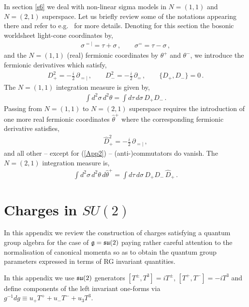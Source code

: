 \documentclass[12pt]{article}
\newcommand{\pp}{{=\!\!\!|}}
\begin{document}
 In section \ref{s6} we deal with non-linear sigma models in $N=(1,1)$ and $N=(2,1)$ superspace. Let us briefly review some of the notations appearing there and refer to e.g.\ \cite{Sevrin:2011mc} for more details. Denoting for this section the bosonic worldsheet light-cone coordinates by,
\begin{eqnarray}
\sigma ^\pp= \tau + \sigma\, ,\qquad \sigma ^== \tau - \sigma \,,
\end{eqnarray}
and the $N=(1,1)$ (real) fermionic coordinates by $ \theta ^+$ and $ \theta ^-$, we introduce the
fermionic derivatives which satisfy,
\begin{eqnarray}
D_+^2= - \frac{i}{2}\, \partial _\pp \,,\qquad D_-^2=- \frac{i}{2}\, \partial _= \,,
\qquad \{D_+,D_-\}=0\,.\label{App2}
\end{eqnarray}
The $N=(1,1)$ integration measure is given by,
\begin{eqnarray}
\int d^ 2 \sigma \,d^2 \theta =\int d\tau \,d \sigma \,D_+D_-\,.
\end{eqnarray}
Passing from $N=(1,1)$ to $ N=(2,1)$ superspace requires
the introduction of one more real fermionic coordinates $ \hat \theta ^+$ where the corresponding fermionic derivative satisfies,
\begin{eqnarray}
\hat D_+^2= - \frac{i}{2} \,\partial _\pp \,,
\end{eqnarray}
and all other -- except for (\ref{App2}) -- (anti-)commutators do vanish.
The $N=(2,1)$ integration measure is,
\begin{eqnarray}
\int d^2 \sigma \,d^2 \theta \, d \hat \theta^+ =
\int d \tau\, d \sigma \,D_+D_-\, \hat D_+ \,.
\end{eqnarray}
 
 \section{Charges in $SU(2)$}\label{a1}
  
 In this appendix we review the construction \cite{Kawaguchi:2013gma}  of charges satisfying a quantum group algebra for the case of $\frak{g}= \frak{su}(2)$ paying rather careful attention to the normalisation of canonical momenta so as to obtain the quantum group parameters expressed in terms of RG invariant quantities.

In this appendix we use $\frak{su}(2)$ generators   $[T^\pm , T^3] = i T^\pm$, $[T^+ , T^- ]= - i T^3$ and  define components of the left invariant one-forms via $g^{-1} dg \equiv u_+ T^+ + u_- T^- + u_3 T^3$.   
 
\end{document}
